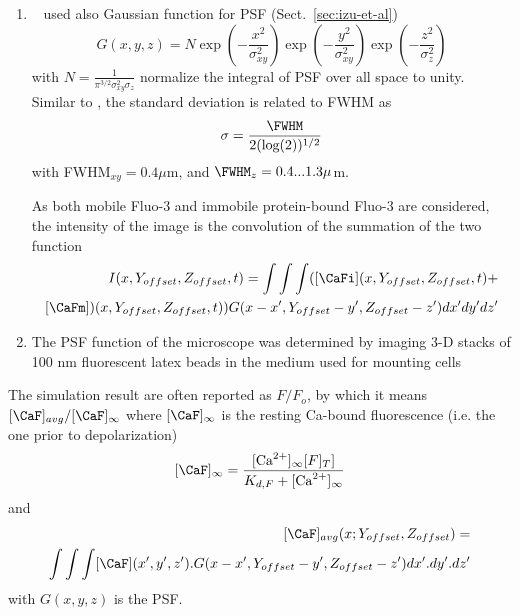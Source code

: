 \begin{enumerate}
\item ~\citep{izu1998} used also Gaussian function for PSF
  (Sect.~\ref{sec:izu-et-al})
  \begin{equation}
    \label{eq:1452}
    G(x,y,z) =
    N\exp(-\frac{x^2}{\sigma^2_{xy}})\exp(-\frac{y^2}{\sigma^2_{xy}})
    \exp(-\frac{z^2}{\sigma^2_{z}})
  \end{equation}
with $N=\frac{1}{\pi^{3/2}\sigma_{xy}^2\sigma_z}$ normalize the
integral of PSF over all space to unity. Similar to \citep{smith1998},
the standard deviation is related to FWHM as
\begin{equation}
  \label{eq:1453}
  \sigma=\frac{\FWHM}{2(\log(2))^{1/2}}
\end{equation}
with FWHM$_{xy}=0.4\mu$m, and $\FWHM_z=0.4...1.3\mu$m.

As both mobile Fluo-3 and immobile protein-bound Fluo-3 are
considered, the intensity of the image is the convolution of the
summation of the two function
\begin{equation}
  \label{eq:1454}
\begin{split}
  I ( x,Y_{offset},Z_{offset},t) = \int\int\int
  ([\CaFi](x,Y_{offset},Z_{offset},t) + \\
  [\CaFm])(x,Y_{offset},Z_{offset},t))
  G(x-x',Y_{offset}-y',Z_{offset}-z') dx'dy'dz'
\end{split}
\end{equation}

\item The PSF function of the microscope was determined by imaging 3-D
  stacks of 100 nm fluorescent latex beads in the medium used for
  mounting cells~\citep{soeller2008}
\end{enumerate}

The simulation result are often reported as $F/F_o$, by which it means
$[\CaF]_{avg}/[\CaF]_\infty$ where $[\CaF]_\infty$ is the resting
Ca-bound fluorescence (i.e. the one prior to depolarization)
\begin{equation}
  \label{eq:1119}
  [\CaF]_\infty = \frac{[\Ca]_\infty [F]_T]}{K_{d,F} + [\Ca]_\infty}
\end{equation}
and
\begin{equation}
  \label{eq:1120}
  \begin{split}
    [\CaF]_{avg}(x; Y_{offset},Z_{offset}) =\\
    \int\int\int [\CaF](x',y',z').G(x-x',Y_{offset}-y',Z_{offset}-z')dx'.dy'.dz'
  \end{split}
\end{equation}
with $G(x,y,z)$ is the PSF.

